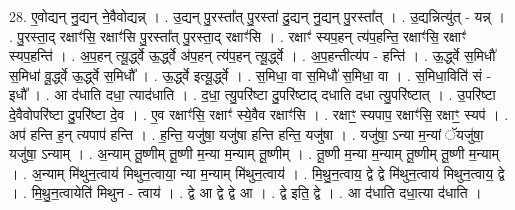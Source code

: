 \documentclass[17pt]{extarticle}
\begin{document}
28. ए॒वोद्यन् नु॒द्यन् ने॒वैवोद्यन्न् । . उ॒द्यन् पु॒रस्ता᳚त् पु॒रस्ता॑ दु॒द्यन् नु॒द्यन् पु॒रस्ता᳚त् । . उ॒द्यन्नित्यु॑त् - यन्न् । . पु॒रस्ता॒द् रक्षाꣳ॑सि॒ रक्षाꣳ॑सि पु॒रस्ता᳚त् पु॒रस्ता॒द् रक्षाꣳ॑सि । . रक्षाꣳ॑ स्यप॒हन् त्य॑प॒हन्ति॒ रक्षाꣳ॑सि॒ रक्षाꣳ॑ स्यप॒हन्ति॑ । . अ॒प॒हन् त्यू॒र्द्ध्वे ऊ॒र्द्ध्वे अ॑प॒हन् त्य॑प॒हन् त्यू॒र्द्ध्वे । . अ॒प॒हन्तीत्य॑प - हन्ति॑ । . ऊ॒र्द्ध्वे स॒मिधौ॑ स॒मिधा॑ वू॒र्द्ध्वे ऊ॒र्द्ध्वे स॒मिधौ᳚ । . ऊ॒र्द्ध्वे इत्यू॒र्द्ध्वे । . स॒मिधा॒ वा स॒मिधौ॑ स॒मिधा॒ वा । . स॒मिधा॒विति॑ सं - इधौ᳚ । . आ द॑धाति दधा॒ त्याद॑धाति । . द॒धा॒ त्यु॒परि॑ष्टा दु॒परि॑ष्टाद् दधाति दधा त्यु॒परि॑ष्टात् । . उ॒परि॑ष्टा दे॒वैवोपरि॑ष्टा दु॒परि॑ष्टा दे॒व । . ए॒व रक्षाꣳ॑सि॒ रक्षाꣳ॑ स्ये॒वैव रक्षाꣳ॑सि । . रक्षाꣳ॒॒ स्यपाप॒ रक्षाꣳ॑सि॒ रक्षाꣳ॒॒ स्यप॑ । . अप॑ हन्ति ह॒न् त्यपाप॑ हन्ति । . ह॒न्ति॒ यजु॑षा॒ यजु॑षा हन्ति हन्ति॒ यजु॑षा । . यजु॑षा॒ ऽन्या म॒न्यां ॅयजु॑षा॒ यजु॑षा॒ ऽन्याम् । . अ॒न्याम् तू॒ष्णीम् तू॒ष्णी म॒न्या म॒न्याम् तू॒ष्णीम् । . तू॒ष्णी म॒न्या म॒न्याम् तू॒ष्णीम् तू॒ष्णी म॒न्याम् । . अ॒न्याम् मि॑थुन॒त्वाय॑ मिथुन॒त्वाया॒ न्या म॒न्याम् मि॑थुन॒त्वाय॑ । . मि॒थु॒न॒त्वाय॒ द्वे द्वे मि॑थुन॒त्वाय॑ मिथुन॒त्वाय॒ द्वे । . मि॒थु॒न॒त्वायेति॑ मिथुन - त्वाय॑ । . द्वे आ द्वे द्वे आ । . द्वे इति॒ द्वे । . आ द॑धाति दधा॒त्या द॑धाति । \newline
\end{document}

